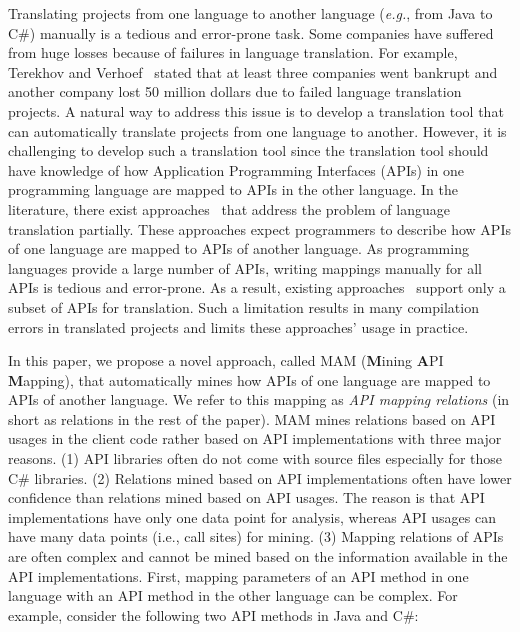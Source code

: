 Translating projects from one language to another language
(\emph{e.g.}, from Java to C\#) manually is a tedious and
error-prone task. Some companies have suffered from huge losses because
of failures in language translation. For example, Terekhov and
Verhoef~\cite{terekhov2000realities} stated that at least three
companies went bankrupt and another company lost 50 million dollars
due to failed language translation projects. A natural way to
address this issue is to develop a translation tool that can
automatically translate projects from one language to another.
However, it is challenging to develop such a translation tool since the
translation tool should have knowledge of how Application
Programming Interfaces (APIs) in one programming
language are mapped to APIs in the other language. In the literature, there exist
approaches~\cite{mossienko2003automated, yasumatsu1995spice} that address the problem of language
translation partially. These approaches expect programmers to
describe how APIs of one language are mapped to APIs of another
language.  As programming languages provide a large number of APIs,
writing mappings manually for all APIs is tedious and error-prone.
As a result, existing approaches~\cite{mossienko2003automated,yasumatsu1995spice}
support only a subset of APIs for translation. Such a limitation
results in many compilation errors in translated projects and limits
these approaches' usage in practice.

In this paper, we propose a novel approach, called MAM
(\textbf{M}ining \textbf{A}PI \textbf{M}apping), that automatically mines
how APIs of one language are mapped to APIs of another language. We
refer to this mapping as \emph{API mapping relations} 
(in short as relations in the rest of the paper). MAM mines relations based on API usages in
the client code rather based on API implementations with three major
reasons. (1) API libraries often do not come with source files
especially for those C\# libraries. (2) Relations mined based on API
implementations often have lower confidence than relations mined
based on API usages. The reason is that API implementations have
only one data point for analysis, whereas API usages can have many
data points (i.e., call sites) for mining. (3) Mapping relations of
APIs are often complex and cannot be mined based on the information
available in the API implementations. First, mapping parameters of
an API method in one language with an API method in the other
language can be complex. For example, consider the following two API
methods in Java and C\#:

